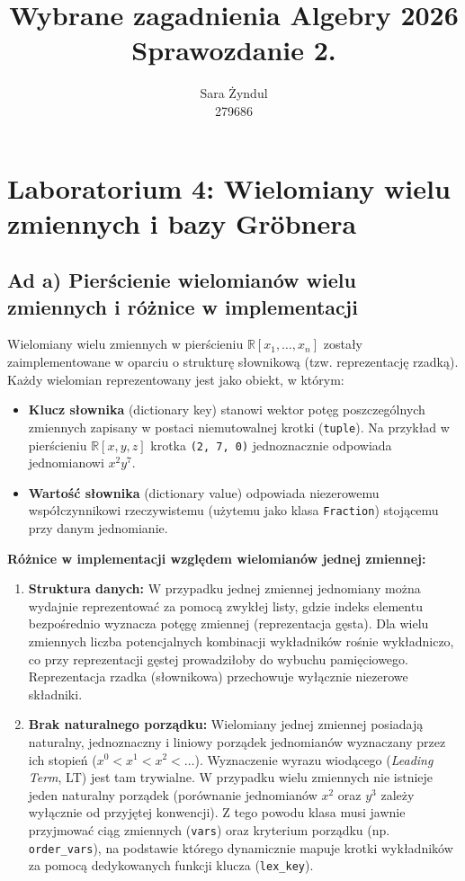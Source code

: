 \documentclass[12pt,a4paper]{article}
\title{Wybrane zagadnienia Algebry 2026\\{\Large Sprawozdanie 2.}}
\author{Sara Żyndul\\279686}
\begin{document}
\maketitle

\section{Laboratorium 4: Wielomiany wielu zmiennych i bazy Gröbnera}

\subsection{Ad a) Pierścienie wielomianów wielu zmiennych i różnice w implementacji}

Wielomiany wielu zmiennych w pierścieniu $\mathbb{R}[x_1, \dots, x_n]$ zostały zaimplementowane w oparciu o strukturę słownikową (tzw. reprezentację rzadką). Każdy wielomian reprezentowany jest jako obiekt, w którym:
\begin{itemize}
    \item \textbf{Klucz słownika} (dictionary key) stanowi wektor potęg poszczególnych zmiennych zapisany w postaci niemutowalnej krotki (\texttt{tuple}). Na przykład w pierścieniu $\mathbb{R}[x, y, z]$ krotka \texttt{(2, 7, 0)} jednoznacznie odpowiada jednomianowi $x^2y^7$.
    \item \textbf{Wartość słownika} (dictionary value) odpowiada niezerowemu współczynnikowi rzeczywistemu (użytemu jako klasa \texttt{Fraction}) stojącemu przy danym jednomianie.
\end{itemize}

\noindent \textbf{Różnice w implementacji względem wielomianów jednej zmiennej:}
\begin{enumerate}
    \item \textbf{Struktura danych:} W przypadku jednej zmiennej jednomiany można wydajnie reprezentować za pomocą zwykłej listy, gdzie indeks elementu bezpośrednio wyznacza potęgę zmiennej (reprezentacja gęsta). Dla wielu zmiennych liczba potencjalnych kombinacji wykładników rośnie wykładniczo, co przy reprezentacji gęstej prowadziłoby do wybuchu pamięciowego. Reprezentacja rzadka (słownikowa) przechowuje wyłącznie niezerowe składniki.
    \item \textbf{Brak naturalnego porządku:} Wielomiany jednej zmiennej posiadają naturalny, jednoznaczny i liniowy porządek jednomianów wyznaczany przez ich stopień ($x^0 < x^1 < x^2 < \dots$). Wyznaczenie wyrazu wiodącego (\textit{Leading Term}, LT) jest tam trywialne. W przypadku wielu zmiennych nie istnieje jeden naturalny porządek (porównanie jednomianów $x^2$ oraz $y^3$ zależy wyłącznie od przyjętej konwencji). Z tego powodu klasa musi jawnie przyjmować ciąg zmiennych (\texttt{vars}) oraz kryterium porządku (np. \texttt{order\_vars}), na podstawie którego dynamicznie mapuje krotki wykładników za pomocą dedykowanych funkcji klucza (\texttt{lex\_key}).
\end{enumerate}
\end{document}
